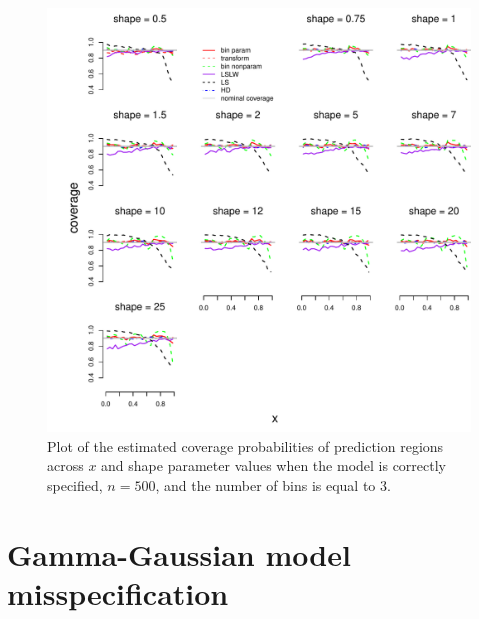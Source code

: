 \documentclass[11pt]{article}\usepackage[]{graphicx}\usepackage[]{color}
\makeatletter
\def\maxwidth{ %
  \ifdim\Gin@nat@width>\linewidth
    \linewidth
  \else
    \Gin@nat@width
  \fi
}
\newenvironment{knitrout}{}{} %
\makeatother
\begin{document}
\newpage
\begin{figure}[h!]
\begin{center}
\begin{knitrout}
\color{fgcolor}
\includegraphics[width=\maxwidth]{figure/Fig-gamma-inx-500-1} 

\end{knitrout}
\end{center}
\caption{Plot of the estimated coverage probabilities of prediction regions 
  across $x$ and shape parameter values when the model is correctly 
  specified, $n = 500$, and the number of bins is equal to $3$.}
\label{Fig:gamma.inx.500}
\end{figure}







\newpage
\section{Gamma-Gaussian model misspecification}
\label{sec:misspec}
\end{document}
